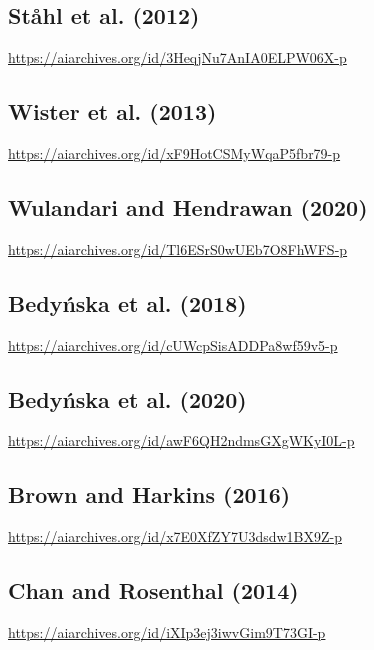 \documentclass[
  doc, a4paper]{apa7}
\begin{document}
\subsection{Ståhl et al. (2012)}\label{stahlrolepreventionfocus2012a}

\url{https://aiarchives.org/id/3HeqjNu7AnIA0ELPW06X-p}

\subsection{Wister et al. (2013)}\label{wistermentioningmenstruationstereotype2013}

\url{https://aiarchives.org/id/xF9HotCSMyWqaP5fbr79-p}

\subsection{Wulandari and Hendrawan (2020)}\label{wulandaritrustyourabilities2020}

\url{https://aiarchives.org/id/Tl6ESrS0wUEb7O8FhWFS-p}

\subsection{Bedyńska et al. (2018)}\label{bedynskachronicstereotypethreat2018}

\url{https://aiarchives.org/id/cUWcpSisADDPa8wf59v5-p}

\subsection{Bedyńska et al. (2020)}\label{bedynskastereotypethreatlinked2020}

\url{https://aiarchives.org/id/awF6QH2ndmsGXgWKyI0L-p}

\subsection{Brown and Harkins (2016)}\label{brownthreatdoesnot2016}

\url{https://aiarchives.org/id/x7E0XfZY7U3dsdw1BX9Z-p}

\subsection{Chan and Rosenthal (2014)}\label{chanworkingmemorymoderates2014}

\url{https://aiarchives.org/id/iXIp3ej3iwvGim9T73GI-p}
\end{document}
